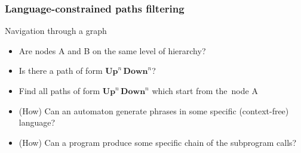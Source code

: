 \documentclass[xcolor=table]{beamer}
\begin{document}
\begin{frame}[fragile]
  \transwipe[direction=90]
  \frametitle{Language-constrained paths filtering}
  \begin{minipage}[m]{0.45\linewidth}
\end{minipage}\hfill
\begin{minipage}[m]{0.5\linewidth}
Navigation through a graph
\begin{itemize}
      \item Are nodes A and B on the same level of hierarchy?
      \item Is there a path of form $\textbf{Up}^n \, \textbf{Down}^n$?
      \item Find all paths of form $\textbf{Up}^n \, \textbf{Down}^n$ which start from the~node A
\end{itemize}

\end{minipage}

  \begin{itemize}
    \item (How) Can an automaton generate phrases in some specific (context-free) language?
    \item (How) Can a program produce some specific chain of the subprogram calls? 
  \end{itemize}
\end{frame}
\end{document}
